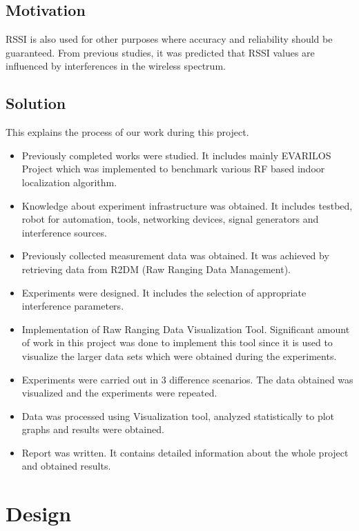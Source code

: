 \documentclass[11pt,a4paper,headinclude,footinclude,chapterprefix=on]{scrreprt}
\begin{document}
\section{Motivation} RSSI is also used for other purposes where accuracy and reliability should be guaranteed. From previous studies, it was predicted that RSSI values are influenced by interferences in the wireless spectrum.

\section{Solution} This explains the process of our work during this project. 
\begin{itemize}
	\item Previously completed works were studied. It includes mainly EVARILOS Project which was implemented to benchmark various RF based indoor localization algorithm. 
	\item Knowledge about experiment infrastructure was obtained. It includes testbed, robot for automation, tools, networking devices, signal generators and interference sources. 
	\item Previously collected measurement data was obtained. It was achieved by retrieving data from R2DM (Raw Ranging Data Management). 
	\item Experiments were designed. It includes the selection of appropriate interference parameters. 
	\item Implementation of Raw Ranging Data Visualization Tool. Significant amount of work in this project was done to implement this tool since it is used to visualize the larger data sets which were obtained during the experiments. 
	\item Experiments were carried out in 3 difference scenarios. The data obtained was visualized and the experiments were repeated. 
	\item Data was processed using Visualization tool, analyzed statistically to plot graphs and results were obtained. 
	\item Report was written. It contains detailed information about the whole project and obtained results. 
\end{itemize}

\chapter{Design} 
\end{document}
